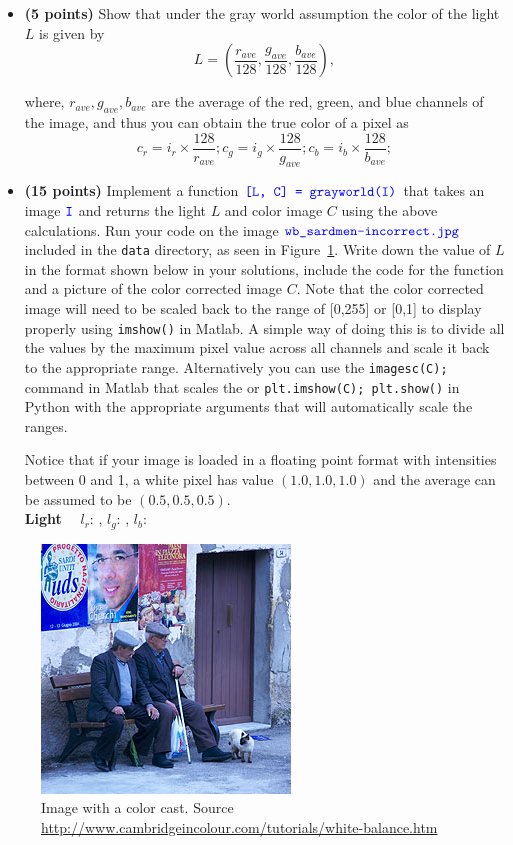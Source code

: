 \documentclass[10pt,letterpaper]{article}
\newcommand{\cmd}[1] {{\color{blue}\texttt{#1}}}
\begin{document}
\begin{itemize}
\item \textbf{(5 points)} Show that under the gray world assumption the color of the light $L$ is given by 
\[
	L = \left(\frac{r_{ave}}{128}, \frac{g_{ave}}{128}, \frac{b_{ave}}{128}\right),
\]

where, $r_{ave}, g_{ave}, b_{ave}$ are the average of the red, green, and blue channels of the image, and thus  you can obtain the true color of a pixel as
\[
	c_r = i_r \times \frac{128}{r_{ave}}; 
	c_g = i_g \times \frac{128}{g_{ave}}; 
	c_b = i_b \times \frac{128}{b_{ave}}; 
\]

\item \textbf{(15 points)} Implement a function $\cmd{[L, C] = grayworld(I)}$ that takes an image $\cmd{I}$ and returns the light $L$ and color image $C$ using the above calculations. Run your code on the image $\cmd{wb\_sardmen-incorrect.jpg}$ included in the \cmd{data} directory, as seen in Figure~\ref{fig:color}.  
Write down the value of $L$ in the format shown below in your solutions, include the code for the function and a picture of the color corrected image $C$. 
Note that the color corrected image will need to be scaled back to the range of [0,255] or [0,1] to display properly using \cmd{imshow()} in Matlab. A simple way of doing this is to divide all the values by the maximum pixel value across all channels and scale it back to the appropriate range.
Alternatively you can use the \cmd{imagesc(C);} command in Matlab that scales the or \cmd{plt.imshow(C); plt.show()} in Python with the appropriate arguments that will automatically scale the ranges.

Notice that if your image is loaded in a floating point format with intensities between 0 and 1, a white pixel has value $(1.0, 1.0, 1.0)$ and the average can be assumed to be $(0.5, 0.5, 0.5)$.\\ 
\textbf{Light}~~ $l_r$: \underline{\hspace{2cm}}, $l_g$: \underline{\hspace{3cm}}, $l_b$:\underline{\hspace{3cm}}
\end{itemize}

\begin{figure}[h]
\centering
\includegraphics[scale=1]{../data/wb_sardmen-incorrect.jpg}
\caption{\label{fig:color} Image with a color cast. Source \url{ http://www.cambridgeincolour.com/tutorials/white-balance.htm}}
\end{figure}
\end{document}
